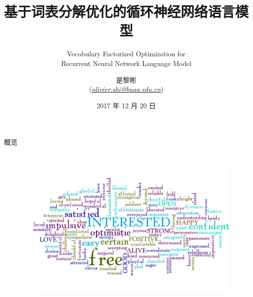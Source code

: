 \documentclass[14pt]{Bredelebeamer}
\title[研究生开题答辩]{基于词表分解优化的循环神经网络语言模型}
\subtitle{Vocabulary Factorized Optimization for \\ Recurrent Neural Network Language Model}
\institute[]{北京航空航天大学中法工程师学院研究生开题答辩}
\author[\href{olivier.shi@buaa.edu.cn}{ \textit{olivier.shi@buaa.edu.cn}}]{是黎彬\\ (\href{mailto:olivier.shi@buaa.edu.cn}{\textit{olivier.shi@buaa.edu.cn}})}
\date{ 2017 年 12 月 20 日}
\begin{document}
\begin{frame}
  \titlepage
\end{frame}

\begin{frame}{概览}
  \begin{columns}
    \begin{column}{.5\textwidth}
        \tableofcontents
    \end{column}
    \begin{column}{.5\textwidth}
      \begin{figure}
        \centering
        \includegraphics[width=1.\textwidth]{images/word-cloud.png}
      \end{figure}
    \end{column}
  \end{columns}
\end{frame}
\end{document}
